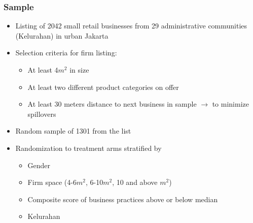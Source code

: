 \documentclass[hideothersubsections, usenames,dvipsnames,10pt]{beamer}
\begin{document}
\begin{frame}
\frametitle{Sample}
\begin{itemize}
\item Listing of 2042 small retail businesses from 29 administrative communities (Kelurahan) in urban Jakarta
\item Selection criteria for firm listing:
	\begin{itemize}
	\item At least 4$m^{2}$ in size
	\item At least two different product categories on offer
	\item At least 30 meters distance to next business in sample $\rightarrow$ to minimize spillovers
	\end{itemize}
\item Random sample of 1301 from the list
\item Randomization to treatment arms stratified by
	\begin{itemize}
	\item Gender
	\item Firm space (4-6$m^2$, 6-10$m^2$, 10 and above $m^2$)
	\item Composite score of business practices above or below median
	\item Kelurahan
	\end{itemize}
\end{itemize}
\end{frame}
\end{document}
